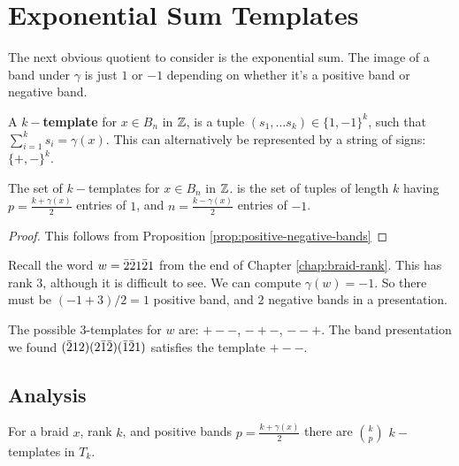 \documentclass[12pt]{thesis}
\begin{document}
\section{Exponential Sum Templates}

The next obvious quotient to consider is the exponential sum.
The image of a band under $\gamma$ is just $1$ or $-1$ depending
on whether it's a positive band or negative band.

\begin{definition}
    A \textbf{$k-$template} for $x \in B_{n}$ in $\mathbb{Z}$,
    is a tuple $(s_{1}, \ldots s_{k}) \in \{ 1, -1 \}^{k}$,
    such that $\sum_{i=1}^{k} s_{i} = \gamma(x)$.
    This can alternatively be represented by a string of signs: $\{ +, - \}^{k}$.
\end{definition}

\begin{proposition}
    The set of $k-$templates for $x \in B_{n}$
    in $\mathbb{Z}$.
    is the set of tuples of length $k$
    having $p = \frac{k + \gamma(x)}{2}$ entries of $1$,
    and $n = \frac{k - \gamma(x)}{2}$ entries of $-1$.
\end{proposition}

\begin{proof}
    This follows from Proposition \ref{prop:positive-negative-bands}
\end{proof}

\begin{example}
    Recall the word $w = \bar{2}\bar{2} 1 \bar{2} 1$ from the end
    of Chapter \ref{chap:braid-rank}.
    This has rank $3$, although it is difficult to see.
    We can compute $\gamma(w) = -1$.
    So there must be $(-1 + 3)/2 = 1$ positive band,
    and $2$ negative bands in a presentation.
    
    The possible $3$-templates for $w$ are:
    $+ - -$, $- + -$, $- - +$.
    The band presentation we found $(\bar{2} 1 2) (2 \bar{1} \bar{2}) (\bar{1} \bar{2} 1)$
    satisfies the template $+ - -$.
\end{example}

\subsection{Analysis}

\begin{proposition}
    For a braid $x$, rank $k$, and positive bands $p = \frac{k + \gamma(x)}{2}$
    there are ${ k \choose p }$ $k-$ templates in $T_{k}$.
\end{proposition}
\end{document}
